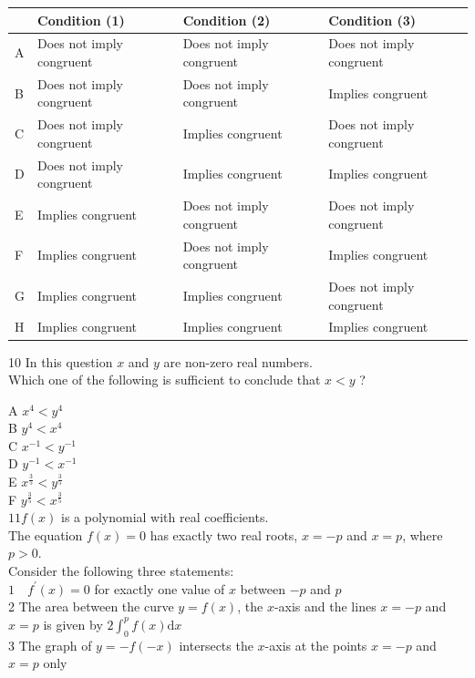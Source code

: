 \documentclass[10pt]{article}
\begin{document}
\begin{center}
\begin{tabular}{|l|l|l|l|}
\hline
 & Condition (1) & Condition (2) & Condition (3) \\
\hline
A & Does not imply congruent & Does not imply congruent & Does not imply congruent \\
\hline
B & Does not imply congruent & Does not imply congruent & Implies congruent \\
\hline
C & Does not imply congruent & Implies congruent & Does not imply congruent \\
\hline
D & Does not imply congruent & Implies congruent & Implies congruent \\
\hline
E & Implies congruent & Does not imply congruent & Does not imply congruent \\
\hline
F & Implies congruent & Does not imply congruent & Implies congruent \\
\hline
G & Implies congruent & Implies congruent & Does not imply congruent \\
\hline
H & Implies congruent & Implies congruent & Implies congruent \\
\hline
\end{tabular}
\end{center}

10 In this question $x$ and $y$ are non-zero real numbers.\\
Which one of the following is sufficient to conclude that $x<y$ ?

A $x^{4}<y^{4}$\\
B $y^{4}<x^{4}$\\
C $x^{-1}<y^{-1}$\\
D $y^{-1}<x^{-1}$\\
E $x^{\frac{3}{5}}<y^{\frac{3}{5}}$\\
F $y^{\frac{3}{5}}<x^{\frac{3}{5}}$\\
$11 f(x)$ is a polynomial with real coefficients.\\
The equation $f(x)=0$ has exactly two real roots, $x=-p$ and $x=p$, where $p>0$.\\
Consider the following three statements:\\
$1 \quad f^{\prime}(x)=0$ for exactly one value of $x$ between $-p$ and $p$\\
2 The area between the curve $y=f(x)$, the $x$-axis and the lines $x=-p$ and $x=p$ is given by $2 \int_{0}^{p} f(x) \mathrm{d} x$\\
3 The graph of $y=-f(-x)$ intersects the $x$-axis at the points $x=-p$ and $x=p$ only
\end{document}
